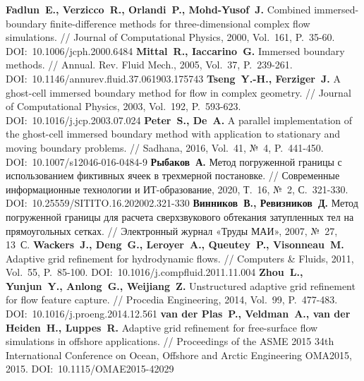 \begin{thebibliography}{99}
%
\textbf{Fadlun~E., Verzicco~R., Orlandi~P., Mohd-Yusof~J.} Combined immersed-boundary finite-difference methods for three-dimensional complex flow simulations. // Journal of Computational Physics, 2000, Vol.~161, P.~35-60. DOI:~10.1006/jcph.2000.6484
%
\textbf{Mittal~R., Iaccarino~G.} Immersed boundary methods. // Annual. Rev. Fluid Mech., 2005, Vol.~37, P.~239-261. DOI:~10.1146/annurev.fluid.37.061903.175743
%
\textbf{Tseng~Y.-H., Ferziger~J.} A ghost-cell immersed boundary method for flow in complex geometry. // Journal of Computational Physics, 2003, Vol.~192, P.~593-623. DOI:~10.1016/j.jcp.2003.07.024
%
\textbf{Peter~S., De~A.} A parallel implementation of the ghost-cell immersed boundary method with application to stationary and moving boundary problems. // Sadhana, 2016, Vol.~41, №~4, P.~441-450. DOI:~10.1007/s12046-016-0484-9
%
\textbf{Рыбаков~А.} Метод погруженной границы с использованием фиктивных ячеек в трехмерной постановке. // Современные информационные технологии и ИТ-образование, 2020, Т.~16, №~2, С.~321-330. DOI:~10.25559/SITITO.16.202002.321-330
%
\textbf{Винников~В., Ревизников~Д.} Метод погруженной границы для расчета сверхзвукового обтекания затупленных тел на прямоугольных сетках. // Электронный журнал «Труды МАИ», 2007, №~27, 13~С.
%
\textbf{Wackers~J., Deng~G., Leroyer~A., Queutey~P., Visonneau~M.} Adaptive grid refinement for hydrodynamic flows. // Computers \& Fluids, 2011, Vol.~55, P.~85-100. DOI:~10.1016/j.compfluid.2011.11.004
%
\textbf{Zhou~L., Yunjun~Y., Anlong~G., Weijiang~Z.} Unstructured adaptive grid refinement for flow feature capture. // Procedia Engineering, 2014, Vol.~99, P.~477-483. DOI:~10.1016/j.proeng.2014.12.561
%
\textbf{van der Plas~P., Veldman~A., van der Heiden~H., Luppes~R.} Adaptive grid refinement for free-surface flow simulations in offshore applications. // Proceedings of the ASME 2015 34th International Conference on Ocean, Offshore and Arctic Engineering OMA2015, 2015. DOI:~10.1115/OMAE2015-42029
%






%
%




\end{thebibliography}
